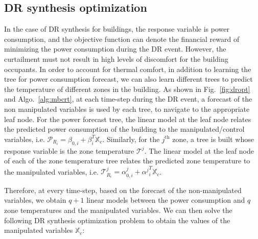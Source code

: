 \subsection{DR synthesis optimization}
In the case of DR synthesis for buildings, the response variable is power consumption, and the objective function can denote the financial reward of minimizing the power consumption during the DR event. However, the curtailment must not result in high levels of discomfort for the building occupants. In order to account for thermal comfort, in addition to learning the tree for power consumption forecast, we can also learn different trees to predict the temperature of different zones in the building. As shown in Fig.~\ref{fig:dropt} and Algo.~\ref{alg:mbcrt}, at each time-step during the DR event, a forecast of the non manipulated variables is used by each tree, to navigate to the appropriate leaf node. For the power forecast tree, the linear model at the leaf node relates the predicted power consumption of the building to the manipulated/control variables, i.e. $\mathcal{P}_{R_i} = \beta_{0,i} + \beta^T_i \mathbb{X}_c$. Similarly, for the $j^{\mathrm{th}}$ zone, a tree is built whose response variable is the zone temperature $\mathcal{T}^j$. The linear model at the leaf node of each of the zone temperature tree relates the predicted zone temperature to the manipulated variables, i.e. $\mathcal{T}_{R_i}^j = \alpha_{0,i}^j + {\alpha^j}^T_i \mathbb{X}_c$.

Therefore, at every time-step, based on the forecast of the non-manipulated variables, we obtain $q+1$ linear models between the power consumption and $q$ zone temperatures and the manipulated variables. We can then solve the following DR synthesis optimization problem to obtain the values of the manipulated variables $\mathbb{X}_c$:

